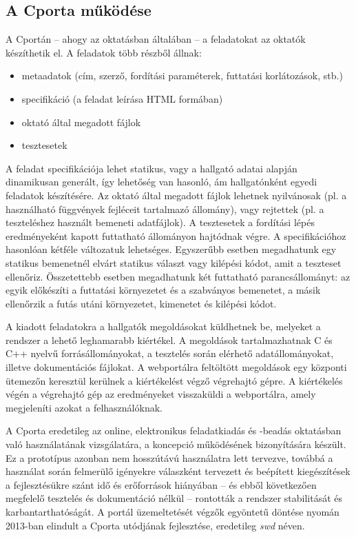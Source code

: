 \subsection{A Cporta működése}
A Cportán -- ahogy az oktatásban általában -- a feladatokat az oktatók készíthetik el.
A feladatok több részből állnak:
\begin{itemize}
    \item metaadatok (cím, szerző, fordítási paraméterek, futtatási korlátozások, stb.)
    \item specifikáció (a feladat leírása HTML formában)
    \item oktató által megadott fájlok
    \item tesztesetek
\end{itemize}
A feladat specifikációja lehet statikus, vagy a hallgató adatai alapján dinamikusan generált, így lehetőség van hasonló, ám hallgatónként egyedi feladatok készítésére.
Az oktató által megadott fájlok lehetnek nyilvánosak (pl. a használható függvények fejléceit tartalmazó állomány), vagy rejtettek (pl. a teszteléshez használt bemeneti adatfájlok).
A tesztesetek a fordítási lépés eredményeként kapott futtatható állományon hajtódnak végre.
A specifikációhoz hasonlóan kétféle változatuk lehetséges.
Egyszerűbb esetben megadhatunk egy statikus bemenetnél elvárt statikus választ vagy kilépési kódot, amit a teszteset ellenőriz.
Összetettebb esetben megadhatunk két futtatható parancsállományt: az egyik előkészíti a futtatási környezetet és a szabványos bemenetet, a másik ellenőrzik a futás utáni környezetet, kimenetet és kilépési kódot.
\cite{Ory13}

A kiadott feladatokra a hallgatók megoldásokat küldhetnek be, melyeket a rendszer a lehető leghamarabb kiértékel.
A megoldások tartalmazhatnak C és C++ nyelvű forrásállományokat, a tesztelés során elérhető adatállományokat, illetve dokumentációs fájlokat.
A webportálra feltöltött megoldások egy központi ütemezőn keresztül kerülnek a kiértékelést végző végrehajtó gépre.
A kiértékelés végén a végrehajtó gép az eredményeket visszaküldi a webportálra, amely megjeleníti azokat a felhasználóknak. 

A Cporta eredetileg az online, elektronikus feladatkiadás és -beadás oktatásban való használatának vizsgálatára, a koncepció működésének bizonyítására készült.
Ez a prototípus azonban nem hosszútávú használatra lett tervezve, továbbá a használat során felmerülő igényekre válaszként tervezett és beépített kiegészítések a fejlesztésükre szánt idő és erőforrások hiányában -- és ebből következően megfelelő tesztelés és dokumentáció nélkül -- rontották a rendszer stabilitását és karbantarthatóságát.  
A portál üzemeltetését végzők egyöntetű döntése nyomán 2013-ban elindult a Cporta utódjának fejlesztése, eredetileg \textit{swd} néven.

